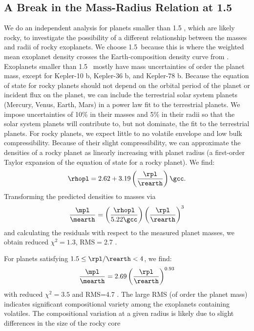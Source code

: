\subsection{A Break in the Mass-Radius Relation at 1.5 \rearth}
We do an independent analysis for planets smaller than 1.5 \rearth, which are likely rocky, to investigate the possibility of a different relationship between the masses and radii of rocky exoplanets.  We choose 1.5\rearth\ because this is where the weighted mean exoplanet density crosses the Earth-composition density curve from \citet[][see Figure \ref{fig:rm_4}]{Seager2007}.  Exoplanets smaller than 1.5 \rearth\ mostly have mass uncertainties of order the planet mass, except for Kepler-10 b, Kepler-36 b, and Kepler-78 b.  Because the equation of state for rocky planets should not depend on the orbital period of the planet or incident flux on the planet, we can include the terrestrial solar system planets (Mercury, Venus, Earth, Mars) in a power law fit to the terrestrial planets.  We impose uncertainties of 10\% in their masses and 5\% in their radii so that the solar system planets will contribute to, but not dominate, the fit to the terrestrial planets.  For rocky planets, we expect little to no volatile envelope and low bulk compressibility.  Because of their slight compressibility, we can approximate the densities of a rocky planet as linearly increasing with planet radius (a first-order Taylor expansion of the equation of state for a rocky planet).  We find:
\begin{equation}
\rhopl = 2.62 + 3.19 \left(\frac{\rpl}{\rearth}\right) \gcc.
\label{eqn:dr_lin_rocky}
\end{equation}
Transforming the predicted densities to masses via 
\begin{equation}
\frac{\mpl}{\mearth} = \left(\frac{\rhopl}{5.22 \gcc}\right) \left(\frac{\rpl}{\rearth}\right)^3
\end{equation}
and calculating the residuals with respect to the measured planet masses, we obtain reduced $\chi^2 = 1.3$, RMS$=$2.7 \mearth.

For planets satisfying $1.5 \le \rpl/\rearth < 4$, we find:
\begin{equation}
\frac{\mpl}{\mearth} = 2.69 \left(\frac{\rpl}{\rearth}\right)^{0.93}
\label{eqn:mr_plaw}
\end{equation}
with reduced $\chi^2=3.5$ and RMS=4.7 \mearth.  The large RMS (of order the planet mass) indicates significant compositional variety among the exoplanets containing volatiles.  The compositional variation at a given radius is likely due to slight differences in the size of the rocky core \citep{Lopez2013}

